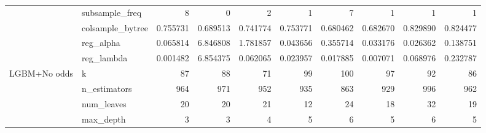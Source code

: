 \documentclass[12pt,twoside]{report}
\begin{document}
\begin{longtable}{llrrrrrrrr}
                                  & subsample\_freq            & 8                        & 0                        & 2                        & 1                        & 7                        & 1                        & 1                        & 1                         \\*
                                  & colsample\_bytree          & 0.755731                 & 0.689513                 & 0.741774                 & 0.753771                 & 0.680462                 & 0.682670                 & 0.829890                 & 0.824477                  \\*
                                  & reg\_alpha                 & 0.065814                 & 6.846808                 & 1.781857                 & 0.043656                 & 0.355714                 & 0.033176                 & 0.026362                 & 0.138751                  \\*
                                  & reg\_lambda                & 0.001482                 & 6.854375                 & 0.062065                 & 0.023957                 & 0.017885                 & 0.007071                 & 0.068976                 & 0.232787                  \\* 
\midrule
\multirow{10}{*}{LGBM+No odds}    & k                          & 87                       & 88                       & 71                       & 99                       & 100                      & 97                       & 92                       & 86                        \\*
                                  & n\_estimators              & 964                      & 971                      & 952                      & 935                      & 863                      & 929                      & 996                      & 962                       \\*
                                  & num\_leaves                & 20                       & 20                       & 21                       & 12                       & 24                       & 18                       & 32                       & 19                        \\*
                                  & max\_depth                 & 3                        & 3                        & 4                        & 5                        & 6                        & 5                        & 6                        & 5                         \\*

\end{longtable}
\end{document}
